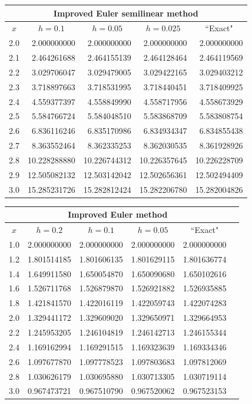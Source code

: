 \documentclass[dvips]{book}
\renewcommand{\exer}[1]{\par\medskip\;\noindent{\color{red}\bf #1.}}
\numberwithin{example}{section}
\numberwithin{equation}{section}
\numberwithin{theorem}{section}
\numberwithin{table}{section}
\numberwithin{figure}{section}
\begin{document}
{\small
\begin{tabular}{|c|r|r|r|r|}
\hline
\multicolumn{5}{|c|}{Improved Euler semilinear method}\\\hline
\multicolumn{1}{|c|}{$x$}&
\multicolumn{1}{|c|}{$h=0.1$}&
\multicolumn{1}{|c|}{$h=0.05$}&
\multicolumn{1}{|c|}{$h=0.025$}&
\multicolumn{1}{|c|}{``Exact"}\\ \hline
2.0 &  2.000000000 &  2.000000000 &  2.000000000 &  2.000000000 \\
2.1 &  2.464261688 &  2.464155139 &  2.464128464 &  2.464119569 \\
2.2 &  3.029706047 &  3.029479005 &  3.029422165 &  3.029403212 \\
2.3 &  3.718897663 &  3.718531995 &  3.718440451 &  3.718409925 \\
2.4 &  4.559377397 &  4.558849990 &  4.558717956 &  4.558673929 \\
2.5 &  5.584766724 &  5.584048510 &  5.583868709 &  5.583808754 \\
2.6 &  6.836116246 &  6.835170986 &  6.834934347 &  6.834855438 \\
2.7 &  8.363552464 &  8.362335253 &  8.362030535 &  8.361928926 \\
2.8 & 10.228288880 & 10.226744312 & 10.226357645 & 10.226228709 \\
2.9 & 12.505082132 & 12.503142042 & 12.502656361 & 12.502494409 \\
3.0 & 15.285231726 & 15.282812424 & 15.282206780 & 15.282004826 \\
\hline
\end{tabular}}

\exer{3.2.16}
{\small
\begin{tabular}{|c|r|r|r|r|r|}
\hline
\multicolumn{5}{|c|}{Improved Euler method}\\\hline
\multicolumn{1}{|c|}{$x$}&
\multicolumn{1}{|c|}{$h=0.2$}&
\multicolumn{1}{|c|}{$h=0.1$}&
\multicolumn{1}{|c|}{$h=0.05$}&
\multicolumn{1}{|c|}{``Exact"}\\ \hline
1.0 & 2.000000000 & 2.000000000 & 2.000000000 & 2.000000000 \\
1.2 & 1.801514185 & 1.801606135 & 1.801629115 & 1.801636774 \\
1.4 & 1.649911580 & 1.650054870 & 1.650090680 & 1.650102616 \\
1.6 & 1.526711768 & 1.526879870 & 1.526921882 & 1.526935885 \\
1.8 & 1.421841570 & 1.422016119 & 1.422059743 & 1.422074283 \\
2.0 & 1.329441172 & 1.329609020 & 1.329650971 & 1.329664953 \\
2.2 & 1.245953205 & 1.246104819 & 1.246142713 & 1.246155344 \\
2.4 & 1.169162994 & 1.169291515 & 1.169323639 & 1.169334346 \\
2.6 & 1.097677870 & 1.097778523 & 1.097803683 & 1.097812069 \\
2.8 & 1.030626179 & 1.030695880 & 1.030713305 & 1.030719114 \\
3.0 & 0.967473721 & 0.967510790 & 0.967520062 & 0.967523153 \\
\hline
\end{tabular}}
\end{document}
